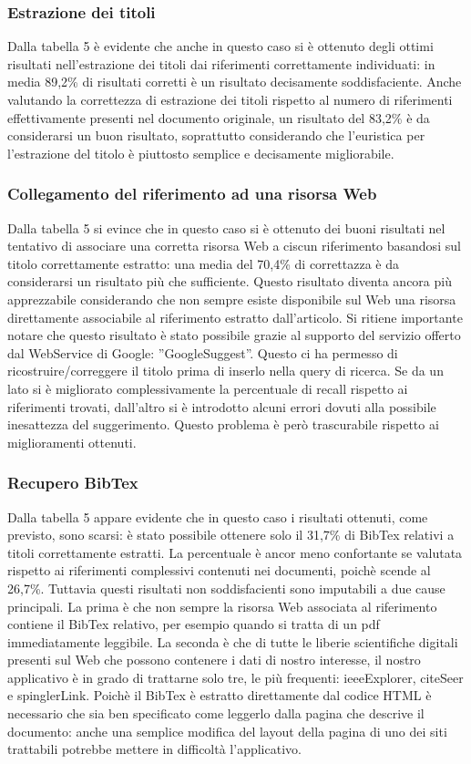 \subsubsection{Estrazione dei titoli}
Dalla tabella 5 è evidente che anche in questo caso si è ottenuto degli ottimi risultati nell'estrazione dei titoli dai riferimenti correttamente individuati: in media 89,2\% di risultati corretti è un risultato decisamente soddisfaciente. Anche valutando la correttezza di estrazione dei titoli rispetto al numero di riferimenti effettivamente presenti nel documento originale, un risultato del 83,2\% è da considerarsi un buon risultato, soprattutto considerando che l'euristica per l'estrazione del titolo è piuttosto semplice e decisamente migliorabile. 

\subsubsection{Collegamento del riferimento ad una risorsa Web}
Dalla tabella 5 si evince che in questo caso si è ottenuto dei buoni risultati nel tentativo di associare una corretta risorsa Web a ciscun riferimento basandosi sul titolo correttamente estratto: una media del 70,4\% di correttazza è da considerarsi un risultato più che sufficiente. Questo risultato diventa ancora più apprezzabile considerando che non sempre esiste disponibile sul Web una risorsa direttamente associabile al riferimento estratto dall'articolo. Si ritiene importante notare che questo risultato è stato possibile grazie al supporto del servizio offerto dal WebService di Google: ''GoogleSuggest''. Questo ci ha permesso di ricostruire/correggere il titolo prima di inserlo nella query di ricerca. Se da un lato si è migliorato complessivamente la percentuale di recall rispetto ai riferimenti trovati, dall'altro si è introdotto alcuni errori dovuti alla possibile inesattezza del suggerimento. Questo problema è però trascurabile rispetto ai miglioramenti ottenuti.

\subsubsection{Recupero BibTex}
Dalla tabella 5 appare evidente che in questo caso i risultati ottenuti, come previsto, sono scarsi: è stato possibile ottenere solo il 31,7\% di BibTex relativi a titoli correttamente estratti. La percentuale è ancor meno confortante se valutata rispetto ai riferimenti complessivi contenuti nei documenti, poichè scende al 26,7\%. Tuttavia questi risultati non soddisfacienti sono imputabili a due cause principali. La prima è che non sempre la risorsa Web associata al riferimento contiene il BibTex relativo, per esempio quando si tratta di un pdf immediatamente leggibile. La seconda è che di tutte le liberie scientifiche digitali presenti sul Web che possono contenere i dati di nostro interesse, il nostro applicativo è in grado di trattarne solo tre, le più frequenti: ieeeExplorer, citeSeer e spinglerLink. Poichè il BibTex è estratto direttamente dal codice HTML è necessario che sia ben specificato come leggerlo dalla pagina che descrive il documento: anche una semplice modifica del layout della pagina di uno dei siti trattabili potrebbe mettere in difficoltà l'applicativo.


